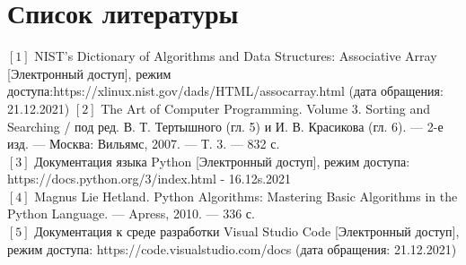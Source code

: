 %
\chapter{Список литературы}
\noindent$[1]$ NIST’s Dictionary of Algorithms and Data Structures: Associative Array [Электронный доступ], режим доступа:https://xlinux.nist.gov/dads/HTML/assocarray.html (дата обращения: 21.12.2021)
$[2]$ The Art of Computer Programming. Volume 3. Sorting and Searching / под ред. В. Т. Тертышного (гл. 5) и И. В. Красикова (гл. 6). — 2-е изд. — Москва: Вильямс, 2007. — Т. 3. — 832 с.\\
$[3]$ Документация языка Python [Электронный доступ], режим доступа: https://docs.python.org/3/index.html - 16.12s.2021\\
$[4]$ Magnus Lie Hetland. Python Algorithms: Mastering Basic Algorithms in the Python Language. — Apress, 2010. — 336 с.\\
$[5]$ Документация к среде разработки Visual Studio Code [Электронный доступ], режим доступа: https://code.visualstudio.com/docs (дата обращения: 21.12.2021)